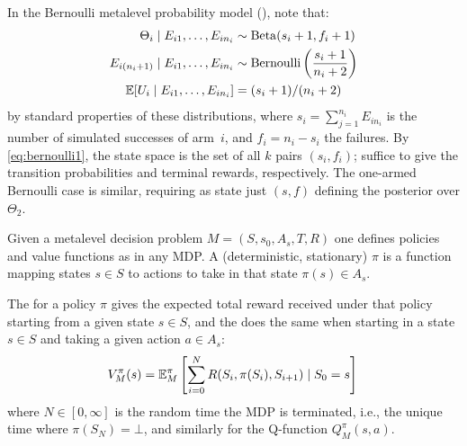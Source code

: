 \begin{example}\label{example:bernoulli2}
In the Bernoulli metalevel probability model (),
note that: 
\begin{align}
	\Theta_i \mid E_{i1},\dots,E_{in_i} &\sim {\rm Beta}(s_i+1, f_i+1)  \label{eq:bernoulli1}\\
	E_{i(n_i+1)} \mid E_{i1},\dots,E_{in_i} &\sim {\rm Bernoulli}\left(\frac{s_i+1}{n_i+2}\right) \label{eq:bernoulli2} \\
	\mathbb{E}[U_i \mid E_{i1},\dots,E_{in_i}] &= (s_i+1)/(n_i+2) \label{eq:bernoulli3}
\end{align}
by standard properties of these distributions, where $s_i=\sum_{j=1}^{n_i} E_{in_i}$
is the number of simulated successes of arm~$i$, and $f_i=n_i-s_i$ the failures.  By \eqref{eq:bernoulli1}, 
the state space is the set of all $k$ pairs $(s_i,f_i)$; 
suffice to give the transition probabilities and terminal rewards, respectively.
The one-armed Bernoulli case is similar, requiring as state just $(s,f)$ defining the posterior over $\Theta_2$.
\end{example}


Given a metalevel decision problem $M=(S,s_0,A_s,T,R)$ one defines policies and 
value functions as in any MDP.  A (deterministic, stationary)  
$\pi$ is a function mapping states $s\in S$ to actions to take in that state $\pi(s)\in A_s$.	

The  for a policy $\pi$ gives the expected total reward
received under that policy starting from a given state $s\in S$, and the 
does the same when starting in a state $s\in S$ and taking a given action $a\in A_s$: 
\begin{equation}
		V^\pi_M(s) = \mathbb{E}^\pi_M\left[ \sum_{i=0}^N R(S_i,\pi(S_i),S_{i+1}) \mid S_0 = s\right]	\label{eq:value-fn}\\
\end{equation}
where $N\in[0,\infty]$ is the random time the MDP is terminated, i.e.,
the unique time where $\pi(S_N)=\bot$,
and similarly for the Q-function $Q^\pi_M(s,a)$.

